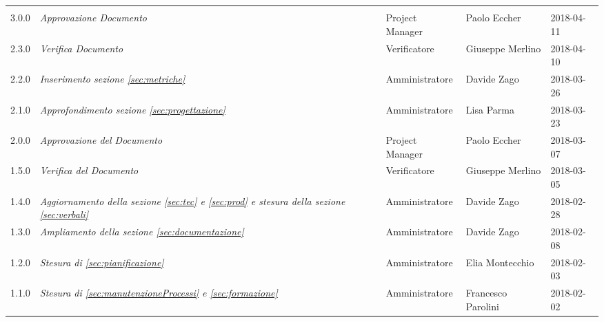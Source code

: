 \newpage 
\section*{}
\begin{table}[H]
	\centering
	\begin{tabular}{p{2cm}|C{4cm}|C{3cm}|C{3cm}|R{2cm}}

		
		
			 &  & &  & \\
		
		
			3.0.0  & \emph{Approvazione Documento} & Project Manager & Paolo Eccher &  2018-04-11 \\
		\hline
		
			2.3.0  & \emph{Verifica Documento} & Verificatore & Giuseppe Merlino &  2018-04-10 \\
		\hline
		
		2.2.0  & \emph{Inserimento sezione \ref{sec:metriche}} & Amministratore & Davide Zago &  2018-03-26 \\
		\hline
		
		2.1.0  & \emph{Approfondimento sezione \ref{sec:progettazione}} & Amministratore & Lisa Parma &  2018-03-23 \\
		\hline
		
		2.0.0  & \emph{Approvazione del Documento} & Project Manager & Paolo Eccher&  2018-03-07 \\
		\hline
		
		1.5.0  &  \emph{Verifica del Documento} & Verificatore & Giuseppe Merlino & 2018-03-05 \\
		\hline
		
		1.4.0  & \emph{Aggiornamento della sezione \ref{sec:tec} e \ref{sec:prod} e stesura della sezione \ref{sec:verbali}} &  Amministratore & Davide Zago & 2018-02-28  \\
		\hline
		
		1.3.0  & \emph{Ampliamento della sezione \ref{sec:documentazione}} &  Amministratore & Davide Zago & 2018-02-08  \\
		\hline
		
		1.2.0  & \emph{Stesura di \ref{sec:pianificazione}} &  Amministratore & Elia Montecchio & 2018-02-03  \\
		\hline
		
		1.1.0  & \emph{Stesura di \ref{sec:manutenzioneProcessi} e \ref{sec:formazione}} &  Amministratore & Francesco Parolini & 2018-02-02  \\
		\hline
		

\end{tabular}
\end{table}
